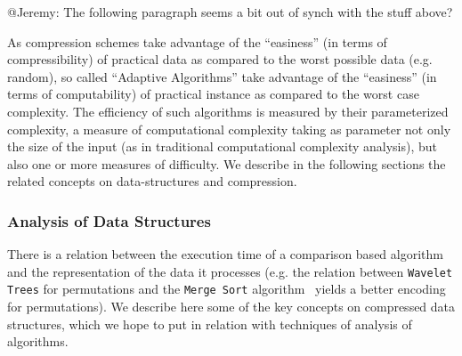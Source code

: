 \documentclass[a4paper,10pt]{article}
\begin{document}
\begin{TODO}
\begin{STEFAN}
@Jeremy: The following paragraph seems a bit out of synch with the stuff above?
\end{STEFAN}
\end{TODO}
As compression schemes take advantage of the ``easiness'' (in terms of compressibility) of practical data as compared to the worst possible data (e.g. random), so called ``Adaptive Algorithms'' take advantage of the ``easiness'' (in terms of computability) of practical instance as compared to the worst case complexity. The efficiency of such algorithms is measured by their parameterized complexity, a measure of computational complexity taking as parameter not only the size of the input (as in traditional computational complexity analysis), but also one or more measures of difficulty. We describe in the following sections the related concepts on data-structures and compression.


\subsubsection{Analysis of Data Structures}
\label{sec:dataStructures}

There is a relation between the execution time of a comparison based algorithm and the representation of the data it processes (e.g.  the relation between \texttt{Wavelet Trees} for permutations and the \texttt{Merge Sort} algorithm~\cite{2013-TCS-CompressedRepresentationsOfPermutationsAndApplications-BarbayNavarro} yields a better encoding for permutations). We describe here some of the key concepts on compressed data structures, which we hope to put in relation with techniques of analysis of algorithms.
\end{document}
